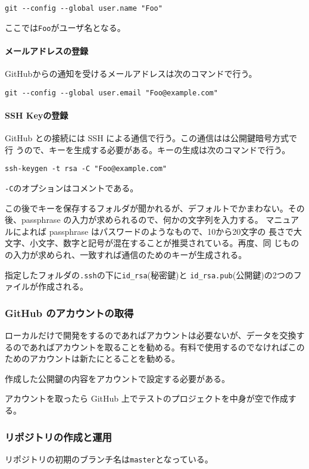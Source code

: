 \Verb+git --config --global user.name "Foo"+

ここでは\Verb+Foo+がユーザ名となる。
\paragraph{メールアドレスの登録}
GitHubからの通知を受けるメールアドレスは次のコマンドで行う。

\Verb+git --config --global user.email "Foo@example.com"+


\paragraph{SSH Keyの登録}
GitHub との接続には SSH による通信で行う。この通信はは公開鍵暗号方式で行
うので、キーを生成する必要がある。キーの生成は次のコマンドで行う。

\Verb+ssh-keygen -t rsa -C "Foo@example.com"+

\Verb+-C+のオプションはコメントである。 

この後でキーを保存するフォルダが聞かれるが、デフォルトでかまわない。その
後、passphrase の入力が求められるので、何かの文字列を入力する。
マニュアルによれば passphrase はパスワードのようなもので、10から20文字の
長さで大文字、小文字、数字と記号が混在することが推奨されている。再度、同
じものの入力が求められ、一致すれば通信のためのキーが生成される。

指定したフォルダの\Verb+.ssh+の下に\Verb+id_rsa+(秘密鍵)と
\Verb+id_rsa.pub+(公開鍵)の2つのファイルが作成される。 

\subsubsection{GitHub のアカウントの取得}
ローカルだけで開発をするのであればアカウントは必要ないが、データを交換す
るのであればアカウントを取ることを勧める。有料で使用するのでなければこの
ためのアカウントは新たにとることを勧める。

作成した公開鍵の内容をアカウントで設定する必要がある。

アカウントを取ったら GitHub 上でテストのプロジェクトを中身が空で作成する。


\subsubsection{リポジトリの作成と運用}
リポジトリの初期のブランチ名は\Verb+master+となっている。

